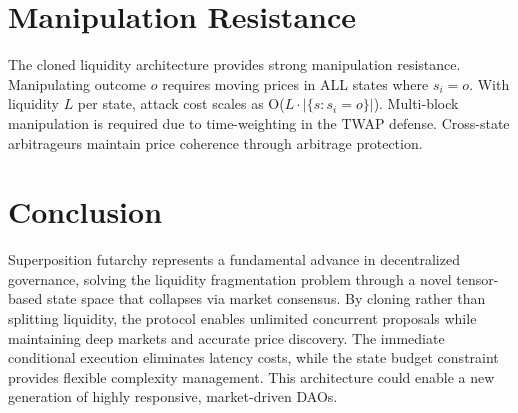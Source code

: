 \documentclass{article}
\begin{document}
\section{Manipulation Resistance}
The cloned liquidity architecture provides strong manipulation resistance. Manipulating outcome $o$ requires moving prices in ALL states where $s_i = o$. With liquidity $L$ per state, attack cost scales as O($L \cdot |\{s : s_i = o\}|$). Multi-block manipulation is required due to time-weighting in the TWAP defense. Cross-state arbitrageurs maintain price coherence through arbitrage protection.

\section{Conclusion}
Superposition futarchy represents a fundamental advance in decentralized governance, solving the liquidity fragmentation problem through a novel tensor-based state space that collapses via market consensus. By cloning rather than splitting liquidity, the protocol enables unlimited concurrent proposals while maintaining deep markets and accurate price discovery. The immediate conditional execution eliminates latency costs, while the state budget constraint provides flexible complexity management. This architecture could enable a new generation of highly responsive, market-driven DAOs.



\end{document}
